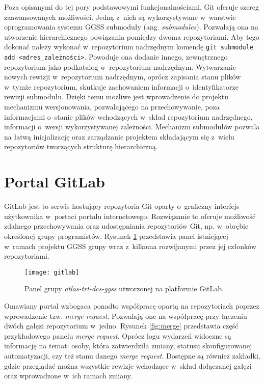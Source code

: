Poza opisanymi do tej pory podstawowymi funkcjonalnościami, Git oferuje szereg zaawansowanych możliwości. Jedną z~nich są wykorzystywane w~warstwie oprogramowania systemu GGSS submoduły (ang. \emph{submodules}). Pozwalają ona na utworzenie hierarchicznego powiązania pomiędzy dwoma repozytoriami. Aby tego dokonać należy wykonać w~repozytorium nadrzędnym komendę \lstinline{git submodule add <adres_zależności>}. Powoduje ona dodanie innego, zewnętrznego repozytorium jako podkatalog w~repozytorium nadrzędnym. Wytwarzanie nowych rewizji w~repozytorium nadrzędnym, oprócz zapisania stanu plików w~tymże repozytorium, skutkuje zachowaniem informacji o~identyfikatorze rewizji submodułu. Dzięki temu możliwe jest wprowadzenie do projektu mechanizmu wersjonowania, pozwalającego na przechowywanie, poza informacjami o~stanie plików wchodzących w~skład repozytorium nadrzędnego, informacji o~wersji wykorzystywanej zależności. Mechanizm submodułów pozwala na łatwą inicjalizację oraz zarządzanie projektem składającym się z~wielu repozytoriów tworzących strukturę hierarchiczną. 

\section{Portal GitLab}
GitLab jest to serwis hostujący repozytoria Git oparty o~graficzny interfejs użytkownika w~postaci portalu internetowego. Rozwiązanie to oferuje możliwość zdalnego przechowywania oraz udostępniania repozytoriów Git, np. w~obrębie określonej grupy programistów. Rysunek \ref{fig:gitlab} przedstawia panel istniejącej w~ramach projektu GGSS grupy wraz z~kilkoma rozwijanymi przez jej członków repozytoriami.

\begin{figure}[H]
    \centering
    \texttt{[image: gitlab]}
    \caption{Panel grupy \emph{atlas-trt-dcs-ggss} utworzonej na platformie GitLab.}
    \label{fig:gitlab}
\end{figure}

Omawiany portal wzbogaca ponadto współpracę opartą na repozytoriach poprzez wprowadzenie tzw. \emph{merge request}. Pozwalają one na współpracę przy łączeniu dwóch gałęzi repozytorium w~jedno. Rysunek \ref{fig:merge} przedstawia część przykładowego panelu \emph{merge request}. Oprócz logu wydarzeń widoczne są informację na temat: osoby, która zatwierdziła zmiany, statusu skonfigurowanej automatyzacji, czy też stanu danego \emph{merge request}. Dostępne są również zakładki, gdzie przeglądać można wszystkie rewizje wchodzące w~skład dołączanej gałęzi oraz wprowadzone w~ich ramach zmiany.

